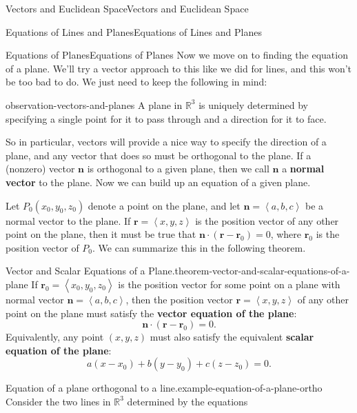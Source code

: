 \documentclass[10pt,]{book}
\newcommand{\terminology}[1]{\textbf{#1}}
\numberwithin{equation}{section}
\newcommand{\RR}{\mathbb{R}}
\newcommand{\vv}[1]{\mathbf{#1}}
\newcommand{\dotprod}[1]{\left\langle #1 \right\rangle}
\begin{document}
\begin{chapterptx}{Vectors and Euclidean Space}{}{Vectors and Euclidean Space}{}{}
\begin{sectionptx}{Equations of Lines and Planes}{}{Equations of Lines and Planes}{}{}
\begin{subsectionptx}{Equations of Planes}{}{Equations of Planes}{}{}
Now we move on to finding the equation of a plane. We'll try a vector approach to this like we did for lines, and this won't be too bad to do. We just need to keep the following in mind:%
\begin{observation}{}{observation-vectors-and-planes}%
\hypertarget{p-999}{}%
A plane in \(\RR^{3}\) is uniquely determined by specifying a single point for it to pass through and a direction for it to face.%
\end{observation}
\hypertarget{p-1000}{}%
So in particular, vectors will provide a nice way to specify the direction of a plane, and any vector that does so must be orthogonal to the plane. If a (nonzero) vector \(\vv{n}\) is orthogonal to a given plane, then we call \(\vv{n}\) a \terminology{normal vector} to the plane. Now we can build up an equation of a given plane.%
\par
\hypertarget{p-1001}{}%
Let \(P_{0}(x_{0},y_{0},z_{0})\) denote a point on the plane, and let \(\vv{n} = \dotprod{a,b,c}\) be a normal vector to the plane. If \(\vv{r}=\dotprod{x,y,z}\) is the position vector of any other point on the plane, then it must be true that \(\vv{n}\cdot(\vv{r}-\vv{r}_{0}) = 0\), where \(\vv{r}_{0}\) is the position vector of \(P_{0}\). We can summarize this in the following theorem.%
\begin{theorem}{Vector and Scalar Equations of a Plane.}{}{theorem-vector-and-scalar-equations-of-a-plane}%
\hypertarget{p-1002}{}%
If \(\vv{r}_{0} = \dotprod{x_{0},y_{0},z_{0}}\) is the position vector for some point on a plane with normal vector \(\vv{n} = \dotprod{a,b,c}\), then the position vector \(\vv{r} = \dotprod{x,y,z}\) of any other point on the plane must satisfy the \terminology{vector equation of the plane}:%
%
\begin{equation*}
\vv{n}\cdot(\vv{r}-\vv{r}_{0}) = 0.
\end{equation*}
\hypertarget{p-1003}{}%
Equivalently, any point \((x,y,z)\) must also satisfy the equivalent \terminology{scalar equation of the plane}:%
%
\begin{equation*}
a(x-x_{0})+b(y-y_{0})+c(z-z_{0}) = 0.
\end{equation*}
\end{theorem}
\begin{example}{Equation of a plane orthogonal to a line.}{example-equation-of-a-plane-ortho}%
\hypertarget{p-1004}{}%
Consider the two lines in \(\RR^{3}\) determined by the equations%
%
\begin{align*}

\end{align*}
\end{example}
\end{subsectionptx}
\end{sectionptx}
\end{chapterptx}
\end{document}
